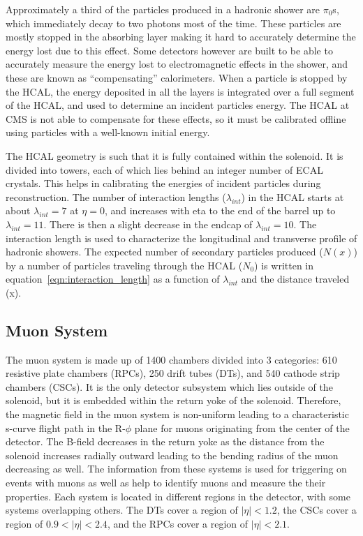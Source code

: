 Approximately a third of the particles produced in a hadronic shower are $\pi_{0}$s, which immediately decay to two photons most of the time.
These particles are mostly stopped in the absorbing layer making it hard to accurately determine the energy lost due to this effect.
Some detectors however are built to be able to accurately measure the energy lost to electromagnetic effects in the shower, and these are known as ``compensating'' calorimeters.
When a particle is stopped by the HCAL, the energy deposited in all the layers is integrated over a full segment of the HCAL, and used to determine an incident particles energy.
The HCAL at CMS is not able to compensate for these effects, so it must be calibrated offline using particles with a well-known initial energy.

The HCAL geometry is such that it is fully contained within the solenoid.
It is divided into towers, each of which lies behind an integer number of ECAL crystals.
This helps in calibrating the energies of incident particles during reconstruction.
The number of interaction lengths ($\lambda_{int}$) in the HCAL starts at about $\lambda_{int} = 7$ at $\eta = 0$, and increases with eta to the end of the barrel up to $\lambda_{int} = 11$.
There is then a slight decrease in the endcap of $\lambda_{int} = 10$.
The interaction length is used to characterize the longitudinal and transverse profile of hadronic showers.
The expected number of secondary particles produced ($N(x)$)
by a number of particles traveling through the HCAL ($N_{0}$)
is written in equation~\ref{eqn:interaction_length} as a function of $\lambda_{int}$ and the distance traveled (x).

\subsection{Muon System}
\label {subs:MUON}
The muon system is made up of 1400 chambers divided into 3 categories: 610 resistive plate chambers (RPCs), 250 drift tubes (DTs), and 540 cathode strip chambers (CSCs).
It is the only detector subsystem which lies outside of the solenoid, but it is embedded within the return yoke of the solenoid.
Therefore, the magnetic field in the muon system is non-uniform leading to a characteristic s-curve
flight path in the R-$\phi$ plane for muons originating from the center of the detector.
The B-field decreases in the return yoke as the distance from the solenoid increases radially outward leading to the bending radius of the muon decreasing as well.
The information from these systems is used for triggering on events with muons as well as help to identify muons and measure the their properties.
Each system is located in different regions in the detector, with some systems overlapping others.
The DTs cover a region of $|\eta| < 1.2$, the CSCs cover a region of $0.9 < |\eta| < 2.4$, and the RPCs cover a region of $|\eta| < 2.1$.

